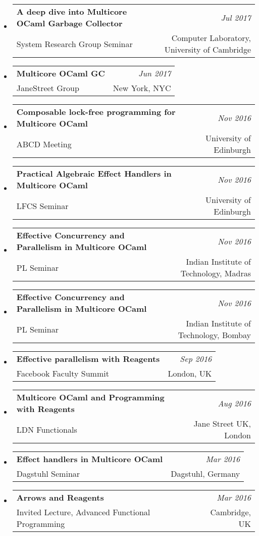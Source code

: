 \documentclass[10pt]{article}
\makeatletter
\newcommand{\lbar}[1]{{\color{#1}\ding{118}}\hspace*{2pt}}
\newenvironment{talk}[4]
{ \item
  \begin{tabular*}{7.5in}{l@{\extracolsep{\fill}}r}
    \textbf{#1} & \textit{#2} \\
		\hspace{1ex} #3 & \small{#4}
\end{tabular*}
} {}
\newenvironment{itemregion}[1]{
	\vspace*{0.5ex}
	{\scalebox{1.4}{\textbf{#1}}}
	\begin{itemize}\itemsep1pt}
	{\end{itemize}\vspace{0.8ex}}
\makeatother
\begin{document}
\begin{itemregion}{\lbar{blue}Talks}

	\begin{talk} {A deep dive into Multicore OCaml Garbage Collector}
		{Jul 2017}  {System Research Group Seminar} {Computer Laboratory, University of Cambridge}
	\end{talk}

	\begin{talk} {Multicore OCaml GC}
		{Jun 2017} {JaneStreet Group} {New York, NYC}
	\end{talk}

	\begin{talk} {Composable lock-free programming for Multicore OCaml}
		{Nov 2016} {ABCD Meeting} {University of Edinburgh}
	\end{talk}

	\begin{talk} {Practical Algebraic Effect Handlers in Multicore OCaml}
		{Nov 2016} {LFCS Seminar} {University of Edinburgh}
	\end{talk}

 	\begin{talk} {Effective Concurrency and Parallelism in Multicore OCaml}
		{Nov 2016} {PL Seminar} {Indian Institute of Technology, Madras}
	\end{talk}

 	\begin{talk} {Effective Concurrency and Parallelism in Multicore OCaml}
		{Nov 2016} {PL Seminar} {Indian Institute of Technology, Bombay}
	\end{talk}

	\begin{talk} {Effective parallelism with Reagents}
		{Sep 2016} {Facebook Faculty Summit} {London, UK}
	\end{talk}
 	\begin{talk} {Multicore OCaml and Programming with Reagents}
		{Aug 2016} {LDN Functionals} {Jane Street UK, London}
	\end{talk}

	\begin{talk} {Effect handlers in Multicore OCaml}
		{Mar 2016} {Dagstuhl Seminar} {Dagstuhl, Germany}
	\end{talk}

	\begin{talk} {Arrows and Reagents}
		{Mar 2016} {Invited Lecture, Advanced Functional Programming} {Cambridge, UK}
	\end{talk}


\end{itemregion}
\end{document}

